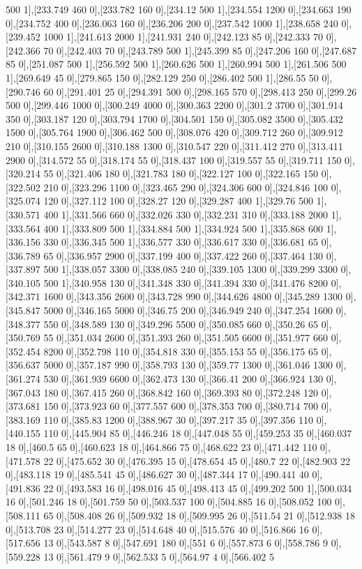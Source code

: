 {500 1],[233.749 460 0],[233.782 160 0],[234.12 500 1],[234.554 1200 0],[234.663 190 0],[234.752 400 0],[236.063 160 0],[236.206 200 0],[237.542 1000 1],[238.658 240 0],[239.452 1000 1],[241.613 2000 1],[241.931 240 0],[242.123 85 0],[242.333 70 0],[242.366 70 0],[242.403 70 0],[243.789 500 1],[245.399 85 0],[247.206 160 0],[247.687 85 0],[251.087 500 1],[256.592 500 1],[260.626 500 1],[260.994 500 1],[261.506 500 1],[269.649 45 0],[279.865 150 0],[282.129 250 0],[286.402 500 1],[286.55 50 0],[290.746 60 0],[291.401 25 0],[294.391 500 0],[298.165 570 0],[298.413 250 0],[299.26 500 0],[299.446 1000 0],[300.249 4000 0],[300.363 2200 0],[301.2 3700 0],[301.914 350 0],[303.187 120 0],[303.794 1700 0],[304.501 150 0],[305.082 3500 0],[305.432 1500 0],[305.764 1900 0],[306.462 500 0],[308.076 420 0],[309.712 260 0],[309.912 210 0],[310.155 2600 0],[310.188 1300 0],[310.547 220 0],[311.412 270 0],[313.411 2900 0],[314.572 55 0],[318.174 55 0],[318.437 100 0],[319.557 55 0],[319.711 150 0],[320.214 55 0],[321.406 180 0],[321.783 180 0],[322.127 100 0],[322.165 150 0],[322.502 210 0],[323.296 1100 0],[323.465 290 0],[324.306 600 0],[324.846 100 0],[325.074 120 0],[327.112 100 0],[328.27 120 0],[329.287 400 1],[329.76 500 1],[330.571 400 1],[331.566 660 0],[332.026 330 0],[332.231 310 0],[333.188 2000 1],[333.564 400 1],[333.809 500 1],[334.884 500 1],[334.924 500 1],[335.868 600 1],[336.156 330 0],[336.345 500 1],[336.577 330 0],[336.617 330 0],[336.681 65 0],[336.789 65 0],[336.957 2900 0],[337.199 400 0],[337.422 260 0],[337.464 130 0],[337.897 500 1],[338.057 3300 0],[338.085 240 0],[339.105 1300 0],[339.299 3300 0],[340.105 500 1],[340.958 130 0],[341.348 330 0],[341.394 330 0],[341.476 8200 0],[342.371 1600 0],[343.356 2600 0],[343.728 990 0],[344.626 4800 0],[345.289 1300 0],[345.847 5000 0],[346.165 5000 0],[346.75 200 0],[346.949 240 0],[347.254 1600 0],[348.377 550 0],[348.589 130 0],[349.296 5500 0],[350.085 660 0],[350.26 65 0],[350.769 55 0],[351.034 2600 0],[351.393 260 0],[351.505 6600 0],[351.977 660 0],[352.454 8200 0],[352.798 110 0],[354.818 330 0],[355.153 55 0],[356.175 65 0],[356.637 5000 0],[357.187 990 0],[358.793 130 0],[359.77 1300 0],[361.046 1300 0],[361.274 530 0],[361.939 6600 0],[362.473 130 0],[366.41 200 0],[366.924 130 0],[367.043 180 0],[367.415 260 0],[368.842 160 0],[369.393 80 0],[372.248 120 0],[373.681 150 0],[373.923 60 0],[377.557 600 0],[378.353 700 0],[380.714 700 0],[383.169 110 0],[385.83 1200 0],[388.967 30 0],[397.217 35 0],[397.356 110 0],[440.155 110 0],[445.904 85 0],[446.246 18 0],[447.048 55 0],[459.253 35 0],[460.037 18 0],[460.5 65 0],[460.623 18 0],[464.866 75 0],[468.622 23 0],[471.442 110 0],[471.578 22 0],[475.652 30 0],[476.395 15 0],[478.654 45 0],[480.7 22 0],[482.903 22 0],[483.118 19 0],[485.541 45 0],[486.627 30 0],[487.344 17 0],[490.441 40 0],[491.836 22 0],[493.583 16 0],[498.016 45 0],[498.413 45 0],[499.202 500 1],[500.034 16 0],[501.246 18 0],[501.759 50 0],[503.537 100 0],[504.885 16 0],[508.052 100 0],[508.111 65 0],[508.408 26 0],[509.932 18 0],[509.995 26 0],[511.54 21 0],[512.938 18 0],[513.708 23 0],[514.277 23 0],[514.648 40 0],[515.576 40 0],[516.866 16 0],[517.656 13 0],[543.587 8 0],[547.691 180 0],[551 6 0],[557.873 6 0],[558.786 9 0],[559.228 13 0],[561.479 9 0],[562.533 5 0],[564.97 4 0],[566.402 5 }
